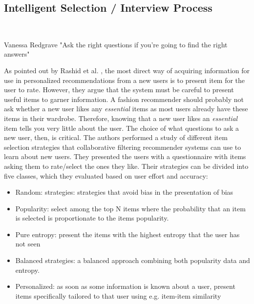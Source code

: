\subsection{Intelligent Selection / Interview Process}\mbox{}\\

\begin{chapquote}[30pt]{Vanessa Redgrave}
  "Ask the right questions if you're going to find the right answers"
\end{chapquote}


As pointed out by Rashid et al. \cite{Rashid2002}, the most direct way of
acquiring information for use in personalized recommendations from a new users
is to present item for the user to rate. However, they argue that the system
must be careful to present useful items to garner information. A fashion
recommender should probably not ask whether a new user likes any \emph{essential}
items as most users already have these items in their wardrobe. Therefore, knowing
that a new user likes an \emph{essential} item tells you very little about
the user. The choice of what questions to ask a new user, then, is critical.
The authors performed a study of different item selection strategies that collaborative
filtering recommender systems can use to learn about new users. They presented the users
with a questionnaire with items asking them to rate/select the ones they like.
Their strategies can be divided into five classes, which they evaluated based
on user effort and accuracy:

\begin{itemize}
\item Random: strategies: strategies that avoid bias in the presentation
	  of bias
\item Popularity: select among the top N items where the probability
	  that an item is selected is proportionate to the items popularity.
\item Pure entropy: present the items with the highest entropy that the
	  user has not seen
\item Balanced strategies: a balanced approach combining both popularity
	  data and entropy.
\item Personalized: as soon as some information is known about a user,
	  present items specifically tailored to that user using e.g. item-item
	  similarity
\end{itemize}

